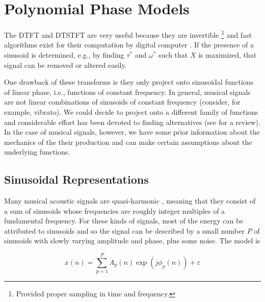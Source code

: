 \section{Polynomial Phase Models\label{sec:polynomphasemodel}}

The DTFT and DTSTFT are very useful because they are invertible
\cite{portnoff1976implementation}%
\footnote{Provided proper sampling in time and frequency.}
and fast algorithms exist for their 
computation by digital computer \cite{van1992computational}. If the presence of
a sinusoid is determined, e.g., by finding $\tau^{\ast}$ and $\omega^{\ast}$ such that
$X$ is maximized, that signal can be removed or altered easily.

One drawback of these transforms is they only project onto sinusoidal functions
of linear phase, i.e., functions of constant frequency. In general, musical
signals are not linear combinations of sinusoids of constant frequency
(consider, for example, vibrato). We could decide to project onto a different
family of functions and considerable effort has been devoted to finding
alternatives (see \cite{kereliuk2011sparse} for a review). In the case of
musical signals, however, we have some prior information about the mechanics of
the their production and can make certain assumptions about the underlying
functions.

\subsection{Sinusoidal Representations\label{sec:mqfmfromphase}} Many musical
acoustic signals are quasi-harmonic \cite{fletcher2012physics}, meaning that
they consist of a sum of sinusoids whose frequencies are roughly integer
multiples of a fundamental frequency. For these kinds of signals, most of the
energy can be attributed to sinusoids and so
the signal can be described by a small number $P$ of sinusoids with
slowly varying amplitude and phase, plus some noise. The model is

\begin{equation}
    \label{eq:sumofsinesampphasesep}
    x(n)=\sum_{p=1}^{P} A_p(n) \exp(j \phi_p(n)) + \varepsilon
\end{equation}


